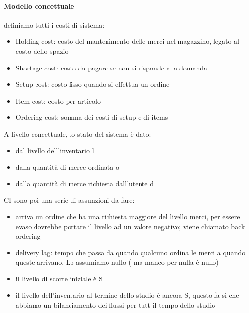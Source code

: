 \documentclass{article}
\begin{document}
\paragraph{Modello concettuale}definiamo tutti i costi di sistema:
\begin{itemize}
\item Holding cost: costo del mantenimento delle merci nel magazzino, legato al costo dello spazio
\item Shortage cost: costo da pagare se non si risponde alla domanda
\item Setup cost: costo fisso quando si effettua un ordine
\item Item cost: costo per articolo
\item Ordering cost: somma dei costi di setup e di items
\end{itemize}
A livello concettuale, lo stato del sistema è dato:
\begin{itemize}
\item dal livello dell'inventario l
\item dalla quantità di merce ordinata o
\item dalla quantità di merce richiesta dall'utente d
\end{itemize}
CI sono poi una serie di assunzioni da fare:
\begin{itemize}
\item arriva un ordine che ha una richiesta maggiore del livello merci, per essere evaso dovrebbe portare il livello ad un valore negativo; viene chiamato back ordering
\item delivery lag: tempo che passa da quando qualcuno ordina le merci a quando queste arrivano. Lo assumiamo nullo ( ma manco per nulla è nullo)
\item il livello di scorte iniziale è S
\item il livello dell'inventario al termine dello studio è ancora S, questo fa si che abbiamo un bilanciamento dei flussi per tutt il tempo dello studio
\end{itemize}
\end{document}
